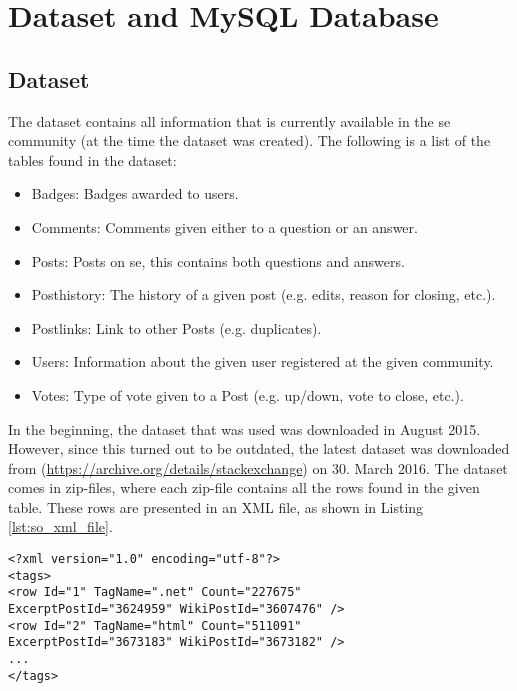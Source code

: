 \label{chap:chapter3}

\section{Dataset and MySQL Database}
\label{sec:dataset_db}

\subsection{Dataset}
The dataset contains all information that is currently available in the \gls{se} community (at the time the dataset was created). 
The following is a list of the tables found in the dataset:
\begin{itemize}
	\item Badges: Badges awarded to users.
	\item Comments: Comments given either to a question or an answer.
	\item Posts: Posts on \gls{se}, this contains both questions and answers.
	\item Posthistory: The history of a given post (e.g. edits, reason for closing, etc.).
	\item Postlinks: Link to other Posts (e.g. duplicates).
	\item Users: Information about the given user registered at the given community.
	\item Votes: Type of vote given to a Post (e.g. up/down, vote to close, etc.).
\end{itemize}
In the beginning, the dataset that was used was downloaded in August 2015. 
However, since this turned out to be outdated, the latest dataset was downloaded from (\url{https://archive.org/details/stackexchange}) on 30. March 2016. 
The dataset comes in zip-files, where each zip-file contains all the rows found in the given table. 
These rows are presented in an XML file, as shown in Listing \ref{lst:so_xml_file}.
\begin{lstlisting}[caption={Content in stackoverflow.com-Tags.xml}, label={lst:so_xml_file}] 
<?xml version="1.0" encoding="utf-8"?>
<tags>
<row Id="1" TagName=".net" Count="227675" 
ExcerptPostId="3624959" WikiPostId="3607476" />
<row Id="2" TagName="html" Count="511091" 
ExcerptPostId="3673183" WikiPostId="3673182" />
...
</tags>
\end{lstlisting}

